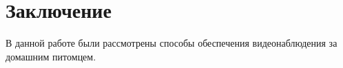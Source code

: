 \section*{Заключение}

В данной работе были рассмотрены способы обеспечения видеонаблюдения за домашним питомцем.